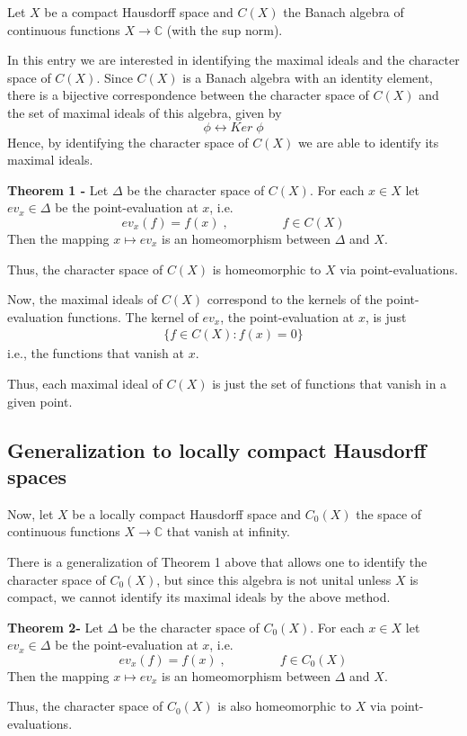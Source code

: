 \documentclass[12pt]{article}
\begin{document}
Let $X$ be a compact Hausdorff space and $C(X)$ the Banach algebra of continuous functions $X \longrightarrow \mathbb{C}$ (with the sup norm).

In this entry we are interested in identifying the maximal ideals and the character space of $C(X)$. Since $C(X)$ is a Banach algebra with an identity element, there is a bijective correspondence between the character space of $C(X)$ and the set of maximal ideals of this algebra, given by
\begin{displaymath}
\phi \longleftrightarrow Ker\; \phi
\end{displaymath}
Hence, by identifying the character space of $C(X)$ we are able to identify its maximal ideals.\\

$\;$

{\bf Theorem 1 -} Let $\Delta$ be the character space of $C(X)$. For each $x \in X$ let $ev_x \in \Delta$ be the point-evaluation at $x$, i.e.
\begin{displaymath}
ev_x(f)=f(x)\;, \qquad\qquad\;f \in C(X)
\end{displaymath}
Then the mapping $x \longmapsto ev_x$ is an homeomorphism between $\Delta$ and $X$.\\

$\;$

Thus, the character space of $C(X)$ is homeomorphic to $X$ via point-evaluations.

Now, the maximal ideals of $C(X)$ correspond to the kernels of the point-evaluation functions. The kernel of $ev_x$, the point-evaluation at $x$, is just
\begin{align*}
\{f \in C(X) : f(x) = 0 \}
\end{align*}
i.e., the functions that vanish at $x$.

Thus, each maximal ideal of $C(X)$ is just the set of functions that vanish in a given point.

\subsection{Generalization to locally compact Hausdorff spaces}
Now, let $X$ be a locally compact Hausdorff space and $C_0(X)$ the space of continuous functions $X \longrightarrow \mathbb{C}$ that vanish at infinity.

There is a generalization of Theorem 1 above that allows one to identify the character space of $C_0(X)$, but since this algebra is not unital unless $X$ is compact, we cannot identify its maximal ideals by the above method.\\

$\;$

{\bf Theorem 2-} Let $\Delta$ be the character space of $C_0(X)$. For each $x \in X$ let $ev_x \in \Delta$ be the point-evaluation at $x$, i.e.
\begin{displaymath}
ev_x(f)=f(x)\;, \qquad\qquad\;f \in C_0(X)
\end{displaymath}
Then the mapping $x \longmapsto ev_x$ is an homeomorphism between $\Delta$ and $X$.\\

$\;$

Thus, the character space of $C_0(X)$ is also homeomorphic to $X$ via point-evaluations.
\end{document}
